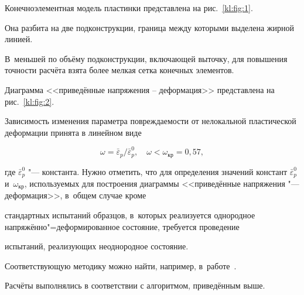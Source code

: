 Конечноэлементная модель пластинки представлена на рис.~\ref{kl:fig:1}. 

Она разбита на две подконструкции, граница между которыми выделена жирной линией. 

В~меньшей по объёму подконструкции, включающей выточку, для повышения точности расчёта взята более мелкая сетка конечных элементов.



Диаграмма <<приведённые напряжения -- деформация>> представлена на рис.~\ref{kl:fig:2}.  

Зависимость изменения параметра повреждаемости от нелокальной пластической деформации принята в линейном виде

\[

\omega ={\bar {\varepsilon }_p }/{\bar {\varepsilon }_p^0},\quad \omega <\omega_{\text{кр}} = 0,57,

\]



\noindent

где $\bar{\varepsilon}_p^0 $ "--- константа. Нужно отметить, что для определения значений констант $\bar{\varepsilon}_p^0$ и~$\omega_\text{кр}$, используемых для построения диаграммы <<приведённые напряжения "--- деформация>>, в~общем случае кроме

стандартных испытаний образцов, в~которых реализуется однородное напряжённо"=деформированное состояние, требуется проведение

испытаний, реализующих неоднородное состояние. 

Соответствующую методику можно найти, например, в~работе~\cite{kleb11:bib16}.











Расчёты выполнялись в соответствии с алгоритмом, приведённым выше.




